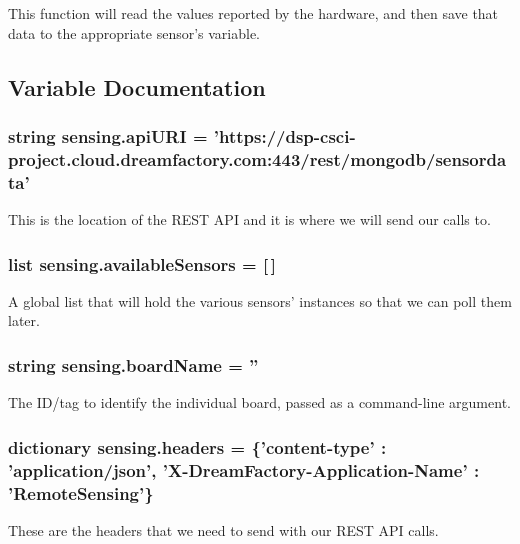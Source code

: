 This function will read the values reported by the hardware, and then save that data to the appropriate sensor's variable. 



\subsection{Variable Documentation}
\hypertarget{namespacesensing_a5de0b501e0135c4f0709266d12fa2814}{
\subsubsection[{api\-U\-R\-I}]{\setlength{\rightskip}{0pt plus 5cm}string sensing.\-api\-U\-R\-I = 'https\-://dsp-\/csci-\/project.\-cloud.\-dreamfactory.\-com\-:443/rest/mongodb/sensordata'}}\label{namespacesensing_a5de0b501e0135c4f0709266d12fa2814}


This is the location of the R\-E\-S\-T A\-P\-I and it is where we will send our calls to. 

\hypertarget{namespacesensing_a46ffa95be1accb04ea0a2c0b89b217c0}{
\subsubsection[{available\-Sensors}]{\setlength{\rightskip}{0pt plus 5cm}list sensing.\-available\-Sensors = \mbox{[}$\,$\mbox{]}}}\label{namespacesensing_a46ffa95be1accb04ea0a2c0b89b217c0}


A global list that will hold the various sensors' instances so that we can poll them later. 

\hypertarget{namespacesensing_a7d59d9b021482661d93cbf2120dfa030}{
\subsubsection[{board\-Name}]{\setlength{\rightskip}{0pt plus 5cm}string sensing.\-board\-Name = ''}}\label{namespacesensing_a7d59d9b021482661d93cbf2120dfa030}


The I\-D/tag to identify the individual board, passed as a command-\/line argument. 

\hypertarget{namespacesensing_a10bdd4ea61df5e84854a462509e3c7d5}{
\subsubsection[{headers}]{\setlength{\rightskip}{0pt plus 5cm}dictionary sensing.\-headers = \{'content-\/type' \-: 'application/json', 'X-\/Dream\-Factory-\/Application-\/Name' \-: 'Remote\-Sensing'\}}}\label{namespacesensing_a10bdd4ea61df5e84854a462509e3c7d5}


These are the headers that we need to send with our R\-E\-S\-T A\-P\-I calls. 

